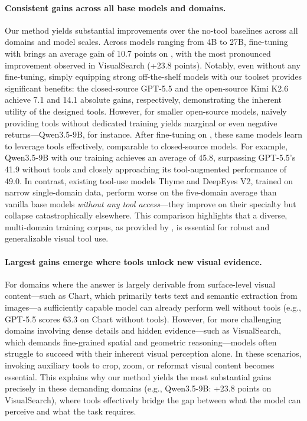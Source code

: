 \paragraph{Consistent gains across all base models and domains.}
Our method yields substantial improvements over the no-tool baselines across all domains and model scales. Across models ranging from 4B to 27B, fine-tuning with \dataset{} brings an average gain of 10.7 points on \benchname, with the most pronounced improvement observed in VisualSearch (+23.8 points). 
Notably, even without any fine-tuning, simply equipping strong off-the-shelf models with our toolset provides significant benefits: the closed-source GPT-5.5 and the open-source Kimi K2.6 achieve 7.1 and 14.1 absolute gains, respectively, demonstrating the inherent utility of the designed tools.
However, for smaller open-source models, naively providing tools without dedicated training yields marginal or even negative returns—Qwen3.5-9B, for instance. After fine-tuning on \dataset, these same models learn to leverage tools effectively, comparable to closed-source models. For example, Qwen3.5-9B with our training achieves an average of 45.8, surpassing GPT-5.5's 41.9 without tools and closely approaching its tool-augmented performance of 49.0.
In contrast, existing tool-use models Thyme and DeepEyes V2, trained on narrow single-domain data, perform worse on the five-domain average than vanilla base models \emph{without any tool access}—they improve on their specialty but collapse catastrophically elsewhere. This comparison highlights that a diverse, multi-domain training corpus, as provided by \dataset{}, is essential for robust and generalizable visual tool use.

\paragraph{Largest gains emerge where tools unlock new visual evidence.}
For domains where the answer is largely derivable from surface-level visual content—such as Chart, which primarily tests text and semantic extraction from images—a sufficiently capable model can already perform well without tools (e.g., GPT-5.5 scores 63.3 on Chart without tools). However, for more challenging domains involving dense details and hidden evidence—such as VisualSearch, which demands fine-grained spatial and geometric reasoning—models often struggle to succeed with their inherent visual perception alone. In these scenarios, invoking auxiliary tools to crop, zoom, or reformat visual content becomes essential. This explains why our method yields the most substantial gains precisely in these demanding domains (e.g., Qwen3.5-9B: +23.8 points on VisualSearch), where tools effectively bridge the gap between what the model can perceive and what the task requires.


